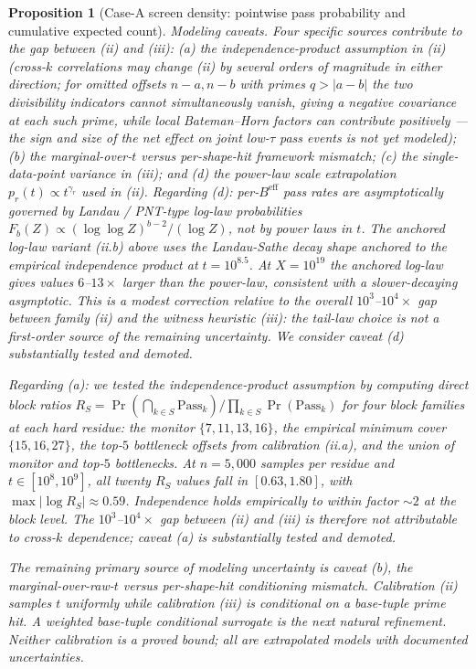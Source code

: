 \documentclass[11pt]{article}
\renewcommand{\_}{\origunderscore\allowbreak}
\newtheorem{proposition}[theorem]{Proposition}
\theoremstyle{definition}
\theoremstyle{remark}
\begin{document}
\begin{proposition}[Case-A screen density: pointwise pass probability and cumulative expected count]
\emph{Modeling caveats.}  Four specific sources contribute to the
gap between (ii) and (iii): (a) the independence-product assumption
in (ii) (cross-$k$ correlations may change (ii) by several orders of
magnitude in either direction; for omitted offsets $n-a,n-b$ with
primes $q>|a-b|$ the two divisibility indicators cannot simultaneously
vanish, giving a negative covariance at each such prime, while local
Bateman--Horn factors can contribute positively — the sign and size of
the net effect on joint low-$\tau$ pass events is not yet modeled);
(b) the marginal-over-$t$ versus per-shape-hit framework mismatch;
(c) the single-data-point variance in (iii); and (d) the power-law
scale extrapolation $p_r(t)\propto t^{\gamma_r}$ used in (ii).
Regarding (d): per-$B^{\mathrm{eff}}$ pass rates are asymptotically
governed by Landau / PNT-type log-law probabilities
$F_b(Z)\propto (\log\log Z)^{b-2}/(\log Z)$, not by power laws in $t$.
The anchored log-law variant (ii.b) above uses the Landau-Sathe decay
shape anchored to the empirical independence product at $t=10^{8.5}$.
At $X=10^{19}$ the anchored log-law gives values $6$--$13\times$
larger than the power-law, consistent with a slower-decaying
asymptotic.  This is a modest correction relative to the overall
$10^3$--$10^4\times$ gap between family (ii) and the witness
heuristic (iii): the tail-law choice is not a first-order source of
the remaining uncertainty.  We consider caveat (d) substantially
tested and demoted.

Regarding (a): we tested the independence-product assumption by
computing direct block ratios
$R_S = \Pr(\bigcap_{k\in S}\mathrm{Pass}_k) / \prod_{k\in S}\Pr(\mathrm{Pass}_k)$
for four block families at each hard residue: the monitor
$\{7,11,13,16\}$, the empirical minimum cover $\{15,16,27\}$, the top-$5$
bottleneck offsets from calibration (ii.a), and the union of monitor
and top-$5$ bottlenecks.  At $n = 5{,}000$ samples per residue and
$t\in[10^8,10^9]$, all twenty $R_S$ values fall in $[0.63, 1.80]$, with
$\max|\log R_S|\approx 0.59$.  Independence holds empirically to
within factor $\sim 2$ at the block level.  The $10^3$--$10^4\times$
gap between (ii) and (iii) is therefore \emph{not} attributable to
cross-$k$ dependence; caveat (a) is substantially tested and
demoted.

The remaining primary source of modeling uncertainty is caveat (b),
the marginal-over-raw-$t$ versus per-shape-hit conditioning mismatch.
Calibration (ii) samples $t$ uniformly while calibration (iii) is
conditional on a base-tuple prime hit.  A weighted base-tuple
conditional surrogate is the next natural refinement.
Neither calibration is a proved bound; all are extrapolated models
with documented uncertainties.


\end{proposition}
\end{document}
